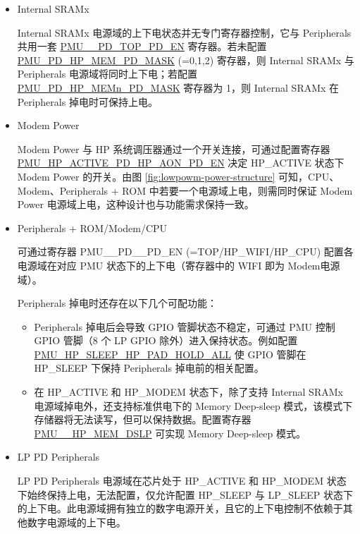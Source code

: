 \documentclass[main\_\_CN.tex]{subfiles}
\begin{document}
\begin{itemize}
\item Internal SRAMx

    Internal SRAMx 电源域的上下电状态并无专门寄存器控制，它与 Peripherals 共用一套 \hyperref[fielddesc:PMUHPACTIVEPDTOPPDEN]{PMU\_\_PD\_TOP\_PD\_EN} 寄存器。若未配置 \hyperref[fielddesc:PMUPDHPMEM0PDMASK]{PMU\_PD\_HP\_MEM\_PD\_MASK} (=0,1,2) 寄存器，则 Internal SRAMx 与 Peripherals 电源域将同时上下电；若配置 \hyperref[fielddesc:PMUPDHPMEM0PDMASK]{PMU\_PD\_HP\_MEMn\_PD\_MASK} 寄存器为 1，则 Internal SRAMx 在 Peripherals 掉电时可保持上电。

\item Modem Power

    Modem Power 与 HP 系统调压器通过一个开关连接，可通过配置寄存器 \hyperref[fielddesc:PMUHPACTIVEPDHPAONPDEN]{PMU\_HP\_ACTIVE\_PD\_HP\_AON\_PD\_EN} 决定 HP\_ACTIVE 状态下 Modem Power 的开关。由图 \ref{fig:lowpowm-power-structure} 可知，CPU、Modem、Peripherals + ROM 中若要一个电源域上电，则需同时保证 Modem Power 电源域上电，这种设计也与功能需求保持一致。

\item Peripherals + ROM/Modem/CPU

    可通过寄存器 PMU\_\_PD\_\_PD\_EN (=TOP/HP\_WIFI/HP\_CPU) 配置各电源域在对应 PMU 状态下的上下电（寄存器中的 WIFI 即为 Modem电源域）。

    Peripherals 掉电时还存在以下几个可配功能：
        \begin{itemize}
        \item Peripherals 掉电后会导致 GPIO 管脚状态不稳定，可通过 PMU 控制 GPIO 管脚（8 个 LP GPIO 除外）进入保持状态。例如配置 \hyperref[fielddesc:PMUHPSLEEPHPPADHOLDALL]{PMU\_HP\_SLEEP\_HP\_PAD\_HOLD\_ALL} 使 GPIO 管脚在 HP\_SLEEP 下保持 Peripherals 掉电前的相关配置。

        \item 在 HP\_ACTIVE 和 HP\_MODEM 状态下，除了支持 Internal SRAMx 电源域掉电外，还支持标准供电下的 Memory Deep-sleep 模式，该模式下存储器将无法读写，但可以保持数据。配置寄存器 \hyperref[fielddesc:PMUHPACTIVEHPMEMDSLP]{PMU\_\_HP\_MEM\_DSLP} 可实现 Memory Deep-sleep 模式。
        \end{itemize}

\item LP PD Peripherals

    LP PD Peripherals 电源域在芯片处于 HP\_ACTIVE 和 HP\_MODEM 状态下始终保持上电，无法配置，仅允许配置 HP\_SLEEP 与 LP\_SLEEP 状态下的上下电。此电源域拥有独立的数字电源开关，且它的上下电控制不依赖于其他数字电源域的上下电。
\end{itemize}
\end{document}
